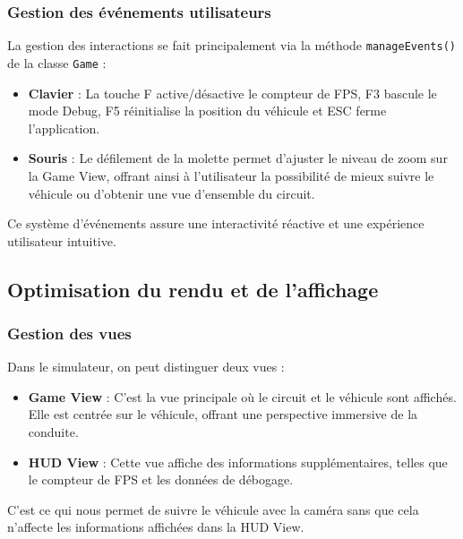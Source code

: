 \subsubsection{Gestion des événements utilisateurs}\label{subsubsec:gestion-des-evenements-utilisateurs}
La gestion des interactions se fait principalement via la méthode \texttt{manageEvents()} de la classe \texttt{Game} :
\begin{itemize}
    \item \textbf{Clavier} : La touche F active/désactive le compteur de FPS, F3 bascule le mode Debug, F5 réinitialise la position du véhicule et ESC ferme l'application.
    \item \textbf{Souris} : Le défilement de la molette permet d'ajuster le niveau de zoom sur la Game View, offrant ainsi à l'utilisateur la possibilité de mieux suivre le véhicule ou d'obtenir une vue d'ensemble du circuit.
\end{itemize}
Ce système d'événements assure une interactivité réactive et une expérience utilisateur intuitive.

\subsection{Optimisation du rendu et de l'affichage}\label{subsec:optimisation-du-rendu-et-de-l-affichage}
\subsubsection{Gestion des vues}\label{subsubsec:gestion-des-vues}
Dans le simulateur, on peut distinguer deux vues :
\begin{itemize}
    \item \textbf{Game View} : C'est la vue principale où le circuit et le véhicule sont affichés.
    Elle est centrée sur le véhicule, offrant une perspective immersive de la conduite.
    \item \textbf{HUD View} : Cette vue affiche des informations supplémentaires, telles que le compteur de FPS et les données de débogage.
\end{itemize}

C'est ce qui nous permet de suivre le véhicule avec la \og caméra \fg{} sans que cela n'affecte les informations affichées dans la HUD View.

